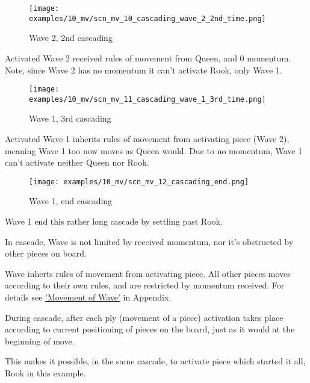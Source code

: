 \clearpage %

\noindent
\begin{wrapfigure}[7]{l}{0.5625\textwidth}
\centering
\texttt{[image: examples/10\_mv/scn\_mv\_10\_cascading\_wave\_2\_2nd\_time.png]}
\caption{Wave 2, 2nd cascading}
\label{fig:scn_mv_10_cascading_wave_2_2nd_time}
\end{wrapfigure}
Activated Wave 2 received rules of movement from Queen, and 0 momentum.
Note, since Wave 2 has no momentum it can't activate Rook, only Wave 1.

\vspace*{0.245\textheight}
\noindent
\begin{wrapfigure}[9]{r}{0.5625\textwidth}
\centering
\texttt{[image: examples/10\_mv/scn\_mv\_11\_cascading\_wave\_1\_3rd\_time.png]}
\caption{Wave 1, 3rd cascading}
\label{fig:scn_mv_11_cascading_wave_1_3rd_time}
\end{wrapfigure}
Activated Wave 1 inherits rules of movement from activating piece (Wave 2),
meaning Wave 1 too now moves as Queen would. Due to no momentum, Wave 1 can't
activate neither Queen nor Rook.

\clearpage %

\noindent
\begin{wrapfigure}[3]{l}{0.5625\textwidth}
\centering
\texttt{[image: examples/10\_mv/scn\_mv\_12\_cascading\_end.png]}
\caption{Wave 1, end cascading}
\label{fig:scn_mv_12_cascading_end}
\end{wrapfigure}
Wave 1 end this rather long cascade by settling past Rook.

\vspace*{0.345\textheight}
In cascade, Wave is not limited by received momentum, nor it's obstructed by
other pieces on board.

Wave inherts rules of movement from activating piece. All other pieces moves
according to their own rules, and are restricted by momentum received. For details
see \hyperref[sec:Appendix/Movement of Wave]{'Movement of Wave'} in Appendix.

During cascade, after each ply (movement of a piece) activation takes place
according to current positioning of pieces on the board, just as it would
at the beginning of move.

This makes it possible, in the same cascade, to activate piece which started
it all, Rook in this example.

